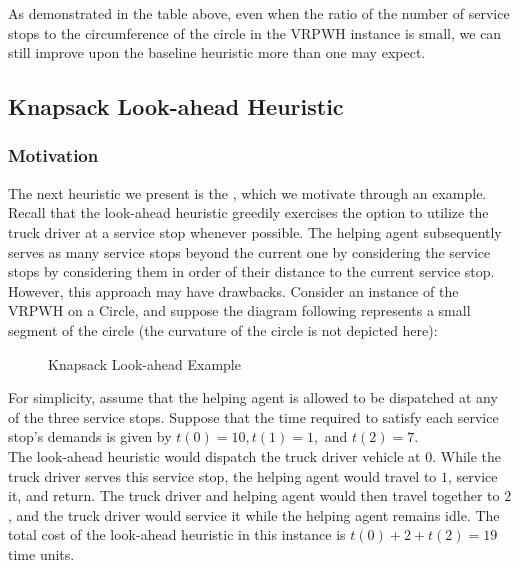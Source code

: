 \documentclass[12pt]{scrartcl}
\begin{document}
As demonstrated in the table above, even when the ratio of the number of service stops to the circumference of the circle in the VRPWH instance is small, we can still improve upon the baseline heuristic more than one may expect.

\subsection{Knapsack Look-ahead Heuristic}
\subsubsection{Motivation}
The next heuristic we present is the , which we motivate through an example. \\ 

Recall that the look-ahead heuristic greedily exercises the option to utilize the truck driver at a service stop whenever possible. The helping agent subsequently serves as many service stops beyond the current one by considering the service stops by considering them in order of their distance to the current service stop. However, this approach may have drawbacks. Consider an instance of the VRPWH on a Circle, and suppose the diagram following represents a small segment of the circle (the curvature of the circle is not depicted here): 

\begin{figure}[H]
  \centering
  \caption{Knapsack Look-ahead Example}
\end{figure}

\noindent For simplicity, assume that the helping agent is allowed to be dispatched at any of the three service stops. Suppose that the time required to satisfy each service stop's demands is given by $t(0) = 10, t(1) = 1,$ and $t(2) = 7$. \\

The look-ahead heuristic would dispatch the truck driver vehicle at $0$. While the truck driver serves this service stop, the helping agent would travel to $1$, service it, and return. The truck driver and helping agent would then travel together to $2$, and the truck driver would service it while the helping agent remains idle. The total cost of the look-ahead heuristic in this instance is $t(0) + 2 + t(2) = 19$ time units. \\
\end{document}
